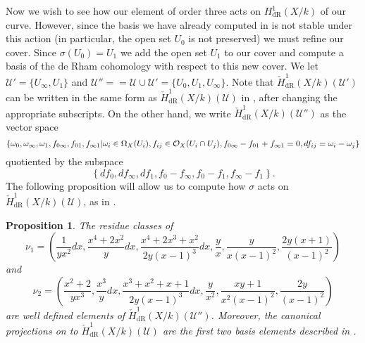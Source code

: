 \documentclass[draft, 11pt]{article} %
\theoremstyle{plain}
\newtheorem{prop}[defn]{Proposition}
\theoremstyle{remark}
\newcommand{\cO}{{\cal O}}
\newcommand{\cU}{{\mathcal U}}
\newcommand{\derhamhone}{H_{\text {dR}}^1(X/k)}
\newcommand{\cechderhamhone}{\check{H}_{\text {dR}}^1(X/k)}
\begin{document}
Now we wish to see how our element of order three acts on $\derhamhone$ of our curve.
However, since the basis we have already computed in \cite[Thm. 2.3]{derhamactions} is not stable under this action (in particular, the open set $U_0$ is not preserved) we must refine our cover.
Since $\sigma(U_0) = U_1$ we add the open set $U_1$ to our cover and compute a basis of the de Rham cohomology with respect to this new cover.
We let $\cU' = \{ U_\infty, U_1\}$ and $\cU'' = = \cU \cup \cU' = \{U_0, U_1, U_\infty\}$.
Note that $\cechderhamhone(\cU')$ can be written in the same form as $\cechderhamhone(\cU)$ in \cite[Pg. 2]{derhamactions}, after changing the appropriate subscripts.
On the other hand, we write $\cechderhamhone(\cU'')$ as the vector space
\begin{equation}\label{sixtupleconditions}
\left\{ \omega_0, \omega_\infty , \omega_1, f_{0\infty}, f_{01},f_{\infty 1} | \omega_i \in \Omega_X(U_i), f_{ij} \in \cO_X(U_i \cap U_j), f_{0\infty} - f_{01} + f_{\infty1} = 0, df_{ij} = \omega_i - \omega_j \right\}
\end{equation}
quotiented by the subspace 
\[
\left\{ df_0, df_\infty, df_1, f_0- f_\infty, f_0 - f_1, f_\infty - f_1 \right\}.
\]
The following proposition will allow us to compute how $\sigma$ acts on $\cechderhamhone(\cU)$, as in \cite[\S 3]{canonicalrepresentation}.
\begin{prop}
The residue classes of
\[
\nu_1 = \left(\frac{1}{yx^2}dx, \frac{x^4 + 2x^2}{y}dx, \frac{x^4 + 2x^3 +  x^2}{2y(x-1)^3}dx, \frac{y}{x}, \frac{y}{x(x-1)^2}, \frac{2y(x+1)}{(x-1)^2} \right)
\]
and
\[
\nu_2 = \left( \frac{x^2 + 2}{yx^3}, \frac{x^3}{y}dx, \frac{x^3 + x^2 + x+ 1}{2y(x-1)^3}dx, \frac{y}{x^2}, \frac{xy +1}{x^2(x-1)^2}, \frac{2y}{(x-1)^2} \right)
\]
are well defined elements of $\cechderhamhone(\cU'')$.
Moreover, the canonical projections on to $\cechderhamhone(\cU)$ are the first two basis elements described in \cite[Thm. 2.3]{derhamactions}.
\end{prop}
\end{document}
